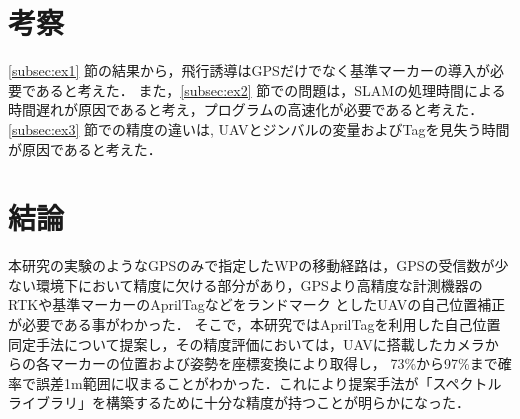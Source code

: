 \documentclass[a4j,fleqn,dvipdfmx,uplatex]{jsarticle}
\newcommand{\figref}[1]{Fig.\ \ref{#1}}
\newcommand{\subsecref}[1]{\ref{#1}\hspace{0.2zw} 節}
\begin{document}
\section{考察}
\subsecref{subsec:ex1}の結果から，飛行誘導はGPSだけでなく基準マーカーの導入が必要であると考えた．
また，\subsecref{subsec:ex2}での問題は，SLAMの処理時間による時間遅れが原因であると考え，プログラムの高速化が必要であると考えた．
\subsecref{subsec:ex3}での精度の違いは, UAVとジンバルの変量およびTagを見失う時間が原因であると考えた．

\section{結論}

本研究の実験のようなGPSのみで指定したWPの移動経路は，GPSの受信数が少ない環境下において精度に欠ける部分があり，GPSより高精度な計測機器のRTKや基準マーカーのAprilTagなどをランドマーク
としたUAVの自己位置補正が必要である事がわかった．
そこで，本研究ではAprilTagを利用した自己位置同定手法について提案し，その精度評価においては，UAVに搭載したカメラからの各マーカーの位置および姿勢を座標変換により取得し，
73\%から97\%まで確率で誤差1m範囲に収まることがわかった．これにより提案手法が「スペクトルライブラリ」を構築するために十分な精度が持つことが明らかになった．


\end{document}
